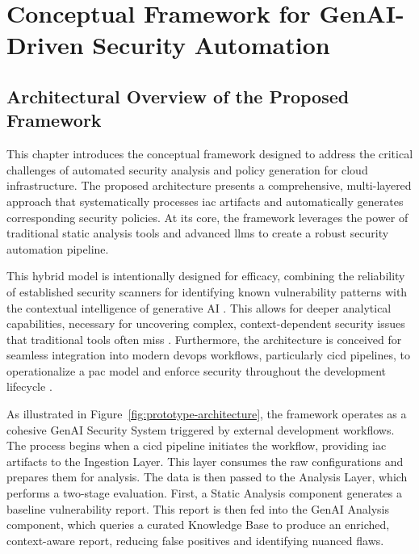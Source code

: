 \chapter{Conceptual Framework for GenAI-Driven Security Automation}
\label{chap:conceptual_framework}

\section{Architectural Overview of the Proposed Framework}
\label{sec:architectural-overview}

This chapter introduces the conceptual framework designed to address the critical challenges of automated security analysis and policy generation for cloud infrastructure. The proposed architecture presents a comprehensive, multi-layered approach that systematically processes \gls{iac} artifacts and automatically generates corresponding security policies. At its core, the framework leverages the power of traditional static analysis tools and advanced \glspl{llm} to create a robust security automation pipeline.

This hybrid model is intentionally designed for efficacy, combining the reliability of established security scanners for identifying known vulnerability patterns with the contextual intelligence of generative AI \cite{khanna_enhancing_2024}. This allows for deeper analytical capabilities, necessary for uncovering complex, context-dependent security issues that traditional tools often miss \cite{akiri_generative_2025}. Furthermore, the architecture is conceived for seamless integration into modern \gls{devops} workflows, particularly \gls{cicd} pipelines, to operationalize a \gls{pac} model and enforce security throughout the development lifecycle \cite{khanna_enhancing_2024}.

As illustrated in Figure~\ref{fig:prototype-architecture}, the framework operates as a cohesive GenAI Security System triggered by external development workflows. The process begins when a \gls{cicd} pipeline initiates the workflow, providing \gls{iac} artifacts to the Ingestion Layer. This layer consumes the raw configurations and prepares them for analysis. The data is then passed to the Analysis Layer, which performs a two-stage evaluation. First, a Static Analysis component generates a baseline vulnerability report. This report is then fed into the GenAI Analysis component, which queries a curated Knowledge Base to produce an enriched, context-aware report, reducing false positives and identifying nuanced flaws.

